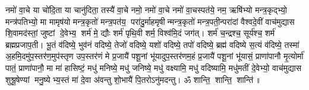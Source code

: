नमो॑ वा॒चे या चो॑दि॒ता या चानु॑दिता॒ तस्यै॑ वा॒चे नमो॒ नमो॑ वा॒चे नमो॑ वा॒चस्पत॑ये॒ नम॒ ऋषि॑भ्यो मन्त्र॒कृद्भ्यो॒ मन्त्र॑पतिभ्यो॒ मा मामृष॑यो मन्त्र॒कृतो॑ मन्त्र॒पत॑य॒ परा॑दु॒र्माहमृषीन्मन्त्र॒कृतो॑ मन्त्र॒पती॒न्परा॑दां वैश्वदे॒वीं वाच॑मुद्यास शि॒वामद॑स्तां॒ जुष्टां दे॒वेभ्य॒ शर्म॑ मे॒ द्यौः  शर्म॑ पृथि॒वी शर्म॒ विश्व॑मि॒दं जग॑त्। 
शर्म॑ च॒न्द्रश्च॒ सूर्य॑श्च॒ शर्म॑ ब्रह्मप्रजाप॒ती। 
भू॒तं व॑दिष्ये॒ भुव॑नं वदिष्ये॒ तेजो॑ वदिष्ये॒ यशो॑ वदिष्ये॒ तपो॑ वदिष्ये॒ ब्रह्म॑ वदिष्ये स॒त्यं व॑दिष्ये॒ तस्मा॑ अ॒हमि॒दमु॑प॒स्तर॑ण॒मुप॑स्तृण उप॒स्तर॑णं मे प्र॒जायै॑ पशू॒नां भू॑यादुप॒स्तर॑णम॒हं प्र॒जायै॑ पशू॒नां भू॑यासं॒ प्राणा॑पानौ मृ॒त्योर्मा॑ पातं॒ प्राणा॑पानौ॒ मा मा॑ हासिष्टं॒ मधु॑ मनिष्ये॒ मधु॑ जनिष्ये॒ मधु॑ वक्ष्यामि॒ मधु॑ वदिष्यामि॒ मधु॑मतीं दे॒वेभ्यो॒ वाच॑मुद्यास शुश्रू॒षेण्यां मनु॒ष्येभ्य॒स्तं मा॑ दे॒वा अ॑वन्तु शो॒भायै॑ पि॒तरोऽनु॑मदन्तु। 
ॐ शान्ति॒ शान्ति॒ शान्ति॑॥ 

\closesection